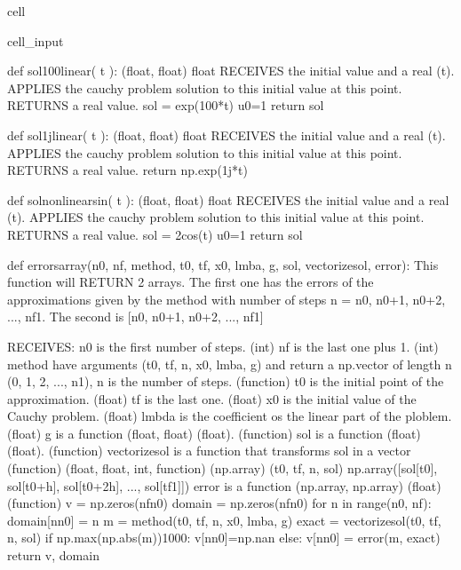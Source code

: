 \documentclass[letterpaper,10pt,english]{jupyterBook}
\begin{document}
\begin{sphinxuseclass}{cell}
\begin{sphinxVerbatimInput}
\begin{sphinxuseclass}{cell_input}
\begin{sphinxVerbatim}[commandchars=\\\{\}]
def sol\PYGZus{}100\PYGZus{}linear( t ):
    \PYGZsq{}\PYGZsq{}\PYGZsq{} (float, float) \PYGZhy{}\PYGZgt{} float
    RECEIVES the initial value and a real (t).
    APPLIES the cauchy problem solution to this initial value at this point.
    RETURNS a real value.
    \PYGZsq{}\PYGZsq{}\PYGZsq{}
    sol = exp(\PYGZhy{}100*t) \PYGZsh{}u0=1
    return sol

def sol\PYGZus{}1j\PYGZus{}linear( t ):
    \PYGZsq{}\PYGZsq{}\PYGZsq{} (float, float) \PYGZhy{}\PYGZgt{} float
    RECEIVES the initial value and a real (t).
    APPLIES the cauchy problem solution to this initial value at this point.
    RETURNS a real value.
    \PYGZsq{}\PYGZsq{}\PYGZsq{}
    return np.exp(1j*t)

def sol\PYGZus{}non\PYGZus{}linear\PYGZus{}sin( t ):
    \PYGZsq{}\PYGZsq{}\PYGZsq{} (float, float) \PYGZhy{}\PYGZgt{} float
    RECEIVES the initial value and a real (t).
    APPLIES the cauchy problem solution to this initial value at this point.
    RETURNS a real value.
    \PYGZsq{}\PYGZsq{}\PYGZsq{}
    sol = 2\PYGZhy{}cos(t) \PYGZsh{}u0=1
    return sol

def errors\PYGZus{}array(n0, nf, method, t0, tf, x0, lmba, g, sol, vectorize\PYGZus{}sol, error):
  \PYGZsq{}\PYGZsq{}\PYGZsq{}
  This function will RETURN 2 arrays.
  The first one has the errors of the approximations given by the method with
  number of steps n = n0, n0+1, n0+2, ..., nf\PYGZhy{}1.
  The second is [n0, n0+1, n0+2, ..., nf\PYGZhy{}1]

  RECEIVES:
  n0 is the first number of steps. (int)
  nf is the last one plus 1. (int)
  method have arguments (t0, tf, n, x0, lmba, g) and return a
  np.vector of length n (0, 1, 2, ..., n\PYGZhy{}1), n is the number of steps. (function)
  t0 is the initial point of the approximation. (float)
  tf is the last one. (float)
  x0 is the initial value of the Cauchy problem. (float)
  lmbda is the coefficient os the linear part of the ploblem. (float)
  g is a function (float, float) \PYGZhy{}\PYGZgt{} (float). (function)
  sol is a function (float) \PYGZhy{}\PYGZgt{} (float). (function)
  vectorize\PYGZus{}sol is a function that \PYGZdq{}transforms sol in a vector\PYGZdq{} (function)
  (float, float, int, function) \PYGZhy{}\PYGZgt{} (np.array)
  (t0, tf, n, sol) \PYGZhy{}\PYGZgt{} np.array([sol[t0], sol[t0+h], sol[t0+2h], ..., sol[tf\PYGZhy{}1]])
  error is a function (np.array, np.array) \PYGZhy{}\PYGZgt{} (float) (function)
  \PYGZsq{}\PYGZsq{}\PYGZsq{}
  v = np.zeros(nf\PYGZhy{}n0)
  domain = np.zeros(nf\PYGZhy{}n0)
  for n in range(n0, nf):
    domain[n\PYGZhy{}n0] = n
    m = method(t0, tf, n, x0, lmba, g)
    exact = vectorize\PYGZus{}sol(t0, tf, n, sol)
    if np.max(np.abs(m))\PYGZgt{}1000:
        v[n\PYGZhy{}n0]=np.nan
    else:
        v[n\PYGZhy{}n0] = error(m, exact)
  return v, domain


\end{sphinxVerbatim}
\end{sphinxuseclass}
\end{sphinxVerbatimInput}
\end{sphinxuseclass}
\end{document}
